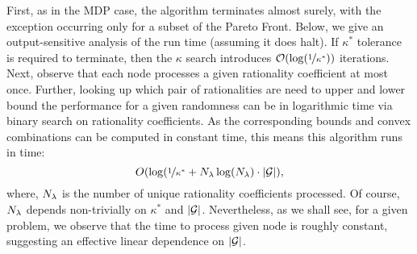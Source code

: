  First, as in the MDP case, the
algorithm terminates almost surely, with the exception occurring only
for a subset of the Pareto Front.  Below, we give an output-sensitive
analysis of the run time (assuming it does halt).  If $\kappa^*$
tolerance is required to terminate, then the $\kappa$ search
introduces $\mathcal{O}(\log(\nicefrac{1}{\kappa^*}))$
iterations. Next, observe that each node processes a given rationality
coefficient at most once. Further, looking up which pair of rationalities
are need to upper and lower bound the performance for a given randomness
can be in logarithmic time via binary search on rationality coefficients.
As the corresponding bounds and convex combinations can be computed in
constant time, this means this algorithm runs in time:
\begin{equation}
  \label{eq:sg-runtime}
  O(\log(\nicefrac{1}{\kappa^*}+ N_\rat\log(N_\rat)\cdot |\sg|),
\end{equation}
where, $N_\lambda$ is the number of unique rationality coefficients
processed.  Of course, $N_\lambda$ depends non-trivially on $\kappa^*$
and $|\mathcal{G}|$. Nevertheless, as we shall see, for a given
problem, we observe that the time to process given node is roughly
constant, suggesting an effective linear dependence on $|\mathcal{G}|$.



